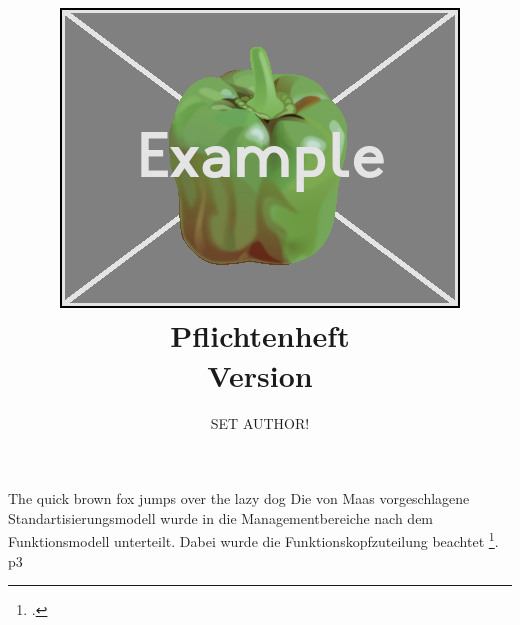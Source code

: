 







\title{\includegraphics[width=\textwidth]{res/logo.png}\\
	Pflichtenheft\\
	\small{Version \vhCurrentVersion}}
\author{SET AUTHOR!}
\date{\vhCurrentDate}


	\maketitle
	
	\tableofcontents
	
	The quick brown fox jumps over the lazy dog \newpage
	Die von Maas vorgeschlagene Standartisierungsmodell \autocite[12]{ARTICLE:1}  wurde in die Managementbereiche nach dem Funktionsmodell \autocite[35-60]{BOOK:1} unterteilt.  Dabei wurde die Funktionskopfzuteilung beachtet \footcite{WEBSITE:1}.\newpage
	p3 \newpage

	\printbibliography

